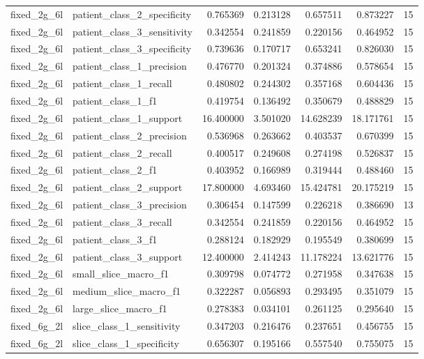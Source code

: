 \begin{tabular}{llrrrrr}
fixed_2g_6l & patient_class_2_specificity & 0.765369 & 0.213128 & 0.657511 & 0.873227 & 15 \\
fixed_2g_6l & patient_class_3_sensitivity & 0.342554 & 0.241859 & 0.220156 & 0.464952 & 15 \\
fixed_2g_6l & patient_class_3_specificity & 0.739636 & 0.170717 & 0.653241 & 0.826030 & 15 \\
fixed_2g_6l & patient_class_1_precision & 0.476770 & 0.201324 & 0.374886 & 0.578654 & 15 \\
fixed_2g_6l & patient_class_1_recall & 0.480802 & 0.244302 & 0.357168 & 0.604436 & 15 \\
fixed_2g_6l & patient_class_1_f1 & 0.419754 & 0.136492 & 0.350679 & 0.488829 & 15 \\
fixed_2g_6l & patient_class_1_support & 16.400000 & 3.501020 & 14.628239 & 18.171761 & 15 \\
fixed_2g_6l & patient_class_2_precision & 0.536968 & 0.263662 & 0.403537 & 0.670399 & 15 \\
fixed_2g_6l & patient_class_2_recall & 0.400517 & 0.249608 & 0.274198 & 0.526837 & 15 \\
fixed_2g_6l & patient_class_2_f1 & 0.403952 & 0.166989 & 0.319444 & 0.488460 & 15 \\
fixed_2g_6l & patient_class_2_support & 17.800000 & 4.693460 & 15.424781 & 20.175219 & 15 \\
fixed_2g_6l & patient_class_3_precision & 0.306454 & 0.147599 & 0.226218 & 0.386690 & 13 \\
fixed_2g_6l & patient_class_3_recall & 0.342554 & 0.241859 & 0.220156 & 0.464952 & 15 \\
fixed_2g_6l & patient_class_3_f1 & 0.288124 & 0.182929 & 0.195549 & 0.380699 & 15 \\
fixed_2g_6l & patient_class_3_support & 12.400000 & 2.414243 & 11.178224 & 13.621776 & 15 \\
fixed_2g_6l & small_slice_macro_f1 & 0.309798 & 0.074772 & 0.271958 & 0.347638 & 15 \\
fixed_2g_6l & medium_slice_macro_f1 & 0.322287 & 0.056893 & 0.293495 & 0.351079 & 15 \\
fixed_2g_6l & large_slice_macro_f1 & 0.278383 & 0.034101 & 0.261125 & 0.295640 & 15 \\
fixed_6g_2l & slice_class_1_sensitivity & 0.347203 & 0.216476 & 0.237651 & 0.456755 & 15 \\
fixed_6g_2l & slice_class_1_specificity & 0.656307 & 0.195166 & 0.557540 & 0.755075 & 15 \\

\end{tabular}
